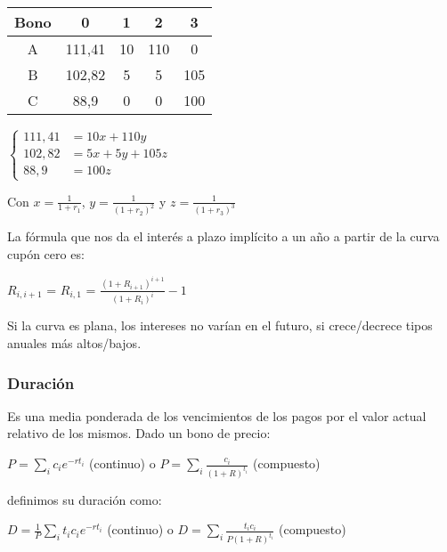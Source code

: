 \documentclass[
10pt, %
a4paper, %
oneside, %
headinclude,footinclude, %
BCOR5mm, %
]{scrartcl}
\newcommand{\verde}{\color{verde}}
\newcommand{\sub}[1]{_{#1}}
\newcommand{\pot}[1]{^{#1}}
\newcommand{\f}[1]{{\large{${#1}$}}}
\newcommand{\sumatorio}[2]{\sum_{#1}^{#2}}
\newcounter{ex}
\newcommand{\ejemplo}{\vspace{0.4cm} {\verde{Ejemplo \arabic{ex}.}}\addtocounter{ex}{1} }
\begin{document}
				\ejemplo

				\begin{multicols}{2}
				\begin{tabular}{|c|c|c|c|c|}
				\hline
				Bono & 0 & 1 & 2 & 3\\
				\hline
				A & 111,41 & 10 & 110 & 0\\
				B & 102,82 & 5 & 5 & 105\\
				C & 88,9 & 0 & 0 & 100\\
				\hline
				\end{tabular}

				\breakcolumn

				\f{ \left\{ 
				\begin{aligned}
				111,41 &= 10 x + 110 y \\ 
				102,82 &= 5x+5y+105z \\ 
				88,9 &= 100z
				\end{aligned}}
				\end{multicols}

				Con \f{x = \frac{1}{1+r\sub{1}}}, \f{y = \frac{1}{(1+r\sub{2})\pot{2}}} y \f{z = \frac{1}{(1+r\sub{3})\pot{3}}}


				La fórmula que nos da el interés a plazo implícito a un año a partir de la curva cupón cero es:
				\begin{center} \f{R\sub{i,i+1}} = \f{R\sub{i,1}} = \f{\frac{(1 + R\sub{i+1})\pot{i+1}}{(1+R\sub{i})\pot{i}} - 1} \end{center}

				Si la curva es plana, los intereses no varían en el futuro, si crece/decrece tipos anuales más altos/bajos.

		\newpage

		\subsubsection{Duración}

			Es una media ponderada de los vencimientos de los pagos por el valor actual relativo de los mismos. Dado un bono de precio:
			\begin{center} \f{P = \sumatorio{i}{} c\sub{i}e\pot{-rt\sub{i}}} (continuo) o \f{P = \sumatorio{i}{} \frac{c\sub{i}}{(1+R)\pot{t\sub{i}}}} (compuesto) \end{center}
			definimos su duración como:
			\begin{center} \f{D = \frac{1}{P} \sumatorio{i}{} t\sub{i}c\sub{i}e\pot{-rt\sub{i}}} (continuo) o \f{D = \sumatorio{i}{} \frac{t\sub{i}c\sub{i}}{P(1+R)\pot{t\sub{i}}}} (compuesto) \end{center}
\end{document}
